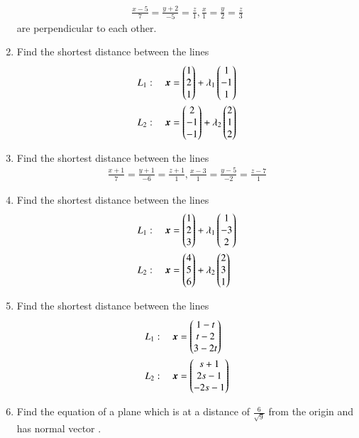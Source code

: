 \begin{enumerate}[label=\arabic*.,ref=\thesubsection.\theenumi]
\begin{align}
\frac{x-5}{7} = \frac{y+2}{-5} = \frac{z}{1}, 
\frac{x}{1} = \frac{y}{2} = \frac{z}{3} 
\end{align}
%
are perpendicular to each other.
\item Find the shortest distance between the lines 
\begin{align}
L_1: \quad \bm{x} &= \begin{pmatrix}1\\2\\1\end{pmatrix} + \lambda_1\begin{pmatrix}1 \\ -1 \\1\end{pmatrix}
\\
L_2: \quad \bm{x} &= \begin{pmatrix}2\\-1\\-1\end{pmatrix} + \lambda_2\begin{pmatrix}2 \\ 1 \\2\end{pmatrix}
\end{align}
\item Find the shortest distance between the lines 
\begin{align}
\frac{x+1}{7} = \frac{y+1}{-6} = \frac{z+1}{1}, 
\frac{x-3}{1} = \frac{y-5}{-2} = \frac{z-7}{1} 
\end{align}
%
\item Find the shortest distance between the lines 
\begin{align}
L_1: \quad \bm{x} &= \begin{pmatrix}1\\2\\3\end{pmatrix} + \lambda_1\begin{pmatrix}1 \\ -3 \\2\end{pmatrix}
\\
L_2: \quad \bm{x} &= \begin{pmatrix}4\\5\\6\end{pmatrix} + \lambda_2\begin{pmatrix}2 \\ 3 \\1\end{pmatrix}
\end{align}
%
\item Find the shortest distance between the lines 
\begin{align}
L_1: \quad \bm{x} &= \begin{pmatrix}1-t\\t-2\\3-2t\end{pmatrix} 
\\
L_2: \quad \bm{x} &= \begin{pmatrix}s+1\\2s-1\\-2s-1\end{pmatrix}
\end{align}
\item Find the equation of a plane which is at a distance of $\frac{6}{\sqrt{9}}$ from the origin and has  normal vector .

\end{enumerate}
